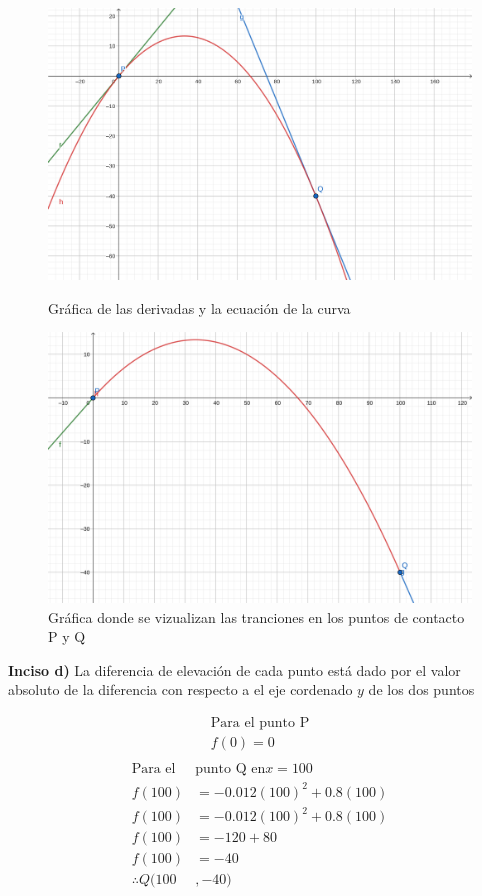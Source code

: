 \begin{figure}
	\centering
	\includegraphics[height = 0.25\textheight]{recursos/geogebra-export.png}\par
	\caption*{Gráfica de las derivadas y la ecuación de la curva}
	\includegraphics[height = 0.25\textheight]{recursos/geogebra-export5.png}\par
	\caption*{Gráfica donde se vizualizan las tranciones en los puntos de contacto P y Q}
\end{figure}

\textbf{Inciso d)} La diferencia de elevación de cada punto está dado por el valor absoluto de la diferencia con respecto a el eje cordenado $y$ de los dos puntos

\begin{multicols}{2}
	\noindent
	\begin{align*}
		\text{Para el punto P} \\
		f(0)=0                 \\
	\end{align*}
	\columnbreak
	\begin{align*}
		\text{Para el }  & \text{punto Q en}  x = 100 \\
		f(100)           & =-0.012(100)^2+0.8(100)    \\
		f(100)           & =-0.012(100)^2+0.8(100)    \\
		f(100)           & =-120+80                   \\
		f(100)           & =-40                       \\
		\therefore Q(100 & ,-40)
	\end{align*}
\end{multicols}

